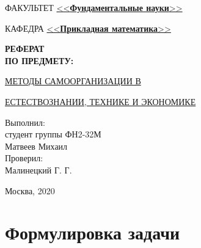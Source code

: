 \documentclass[a4paper]{article}
\begin{document}
\begin{titlepage}
\begin{center}
\fontsize{12pt}{0.1\baselineskip}\selectfont
\noindent\makebox[\linewidth]{\rule{\textwidth}{4pt}} \makebox[\linewidth]{\rule{\textwidth}{1pt}}
\end{center}

\begin{flushleft}
\fontsize{12pt}{0.8\baselineskip}
\selectfont
ФАКУЛЬТЕТ \uline{<<\textbf{Фундаментальные науки}>>}
			
КАФЕДРА \hspace{4mm} \uline{<<\textbf{Прикладная математика}>>}
\end{flushleft}

\vspace{3mm}

\begin{center}
	\begin{large}
		\textbf{РЕФЕРАТ \\ ПО ПРЕДМЕТУ:}
	\end{large}
\end{center}

\begin{center}
\begin{large}		
\uline{\hfill МЕТОДЫ САМООРГАНИЗАЦИИ В \hfill}
	
\uline{\hfill ЕСТЕСТВОЗНАНИИ, ТЕХНИКЕ И ЭКОНОМИКЕ \hfill}	
\end{large}
\end{center}

\vfill

\begin{flushright}
Выполнил: \\
студент группы ФН2-32М \\
Матвеев Михаил \\
\vspace{5mm}
Проверил: \\
Малинецкий Г. Г. \\
\end{flushright}

\vfill

\begin{center}
\normalsize{Москва, 2020}
\end{center}

\end{titlepage}

\section{Формулировка задачи}
\end{document}
